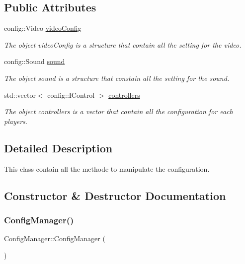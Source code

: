 \subsection*{Public Attributes}
\begin{DoxyCompactItemize}
\item 
config\+::\+Video \hyperlink{classConfigManager_a1e0dbb8563b71871e6c68abce5620cd0}{video\+Config}
\begin{DoxyCompactList}\small\item\em The object video\+Config is a structure that contain all the setting for the video. \end{DoxyCompactList}\item 
config\+::\+Sound \hyperlink{classConfigManager_a010e2da02ebc90d7ce930d1c57a79e96}{sound}
\begin{DoxyCompactList}\small\item\em The object sound is a structure that constain all the setting for the sound. \end{DoxyCompactList}\item 
\mbox{\label{classConfigManager_ad6d6269ec9827af5ca12067a49383132}} 
std\+::vector$<$ config\+::\+I\+Control $>$ \hyperlink{classConfigManager_ad6d6269ec9827af5ca12067a49383132}{controllers}
\begin{DoxyCompactList}\small\item\em The object controllers is a vector that contain all the configuration for each players. \end{DoxyCompactList}\end{DoxyCompactItemize}


\subsection{Detailed Description}
This class contain all the methode to manipulate the configuration. 

\subsection{Constructor \& Destructor Documentation}
\mbox{\label{classConfigManager_a7d3d7c10423d969f7544509f6fcca32f}} 
\subsubsection{\texorpdfstring{Config\+Manager()}{ConfigManager()}}
{\footnotesize\ttfamily Config\+Manager\+::\+Config\+Manager (\begin{DoxyParamCaption}{ }\end{DoxyParamCaption})}




